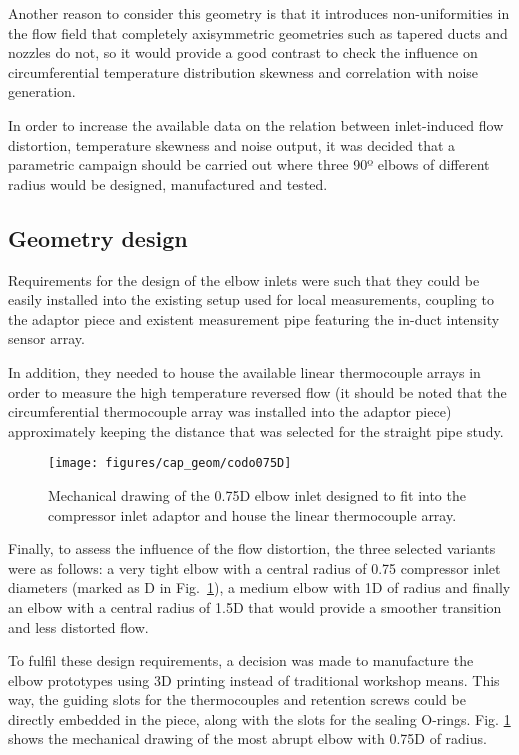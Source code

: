 Another reason to consider this geometry is that it introduces non-unifor\-mi\-ties in the flow field that completely axisymmetric geometries such as tapered ducts and nozzles do not, so it would provide a good contrast to check the influence on circumferential temperature distribution skewness and correlation with noise generation.

In order to increase the available data on the relation between inlet-induced flow distortion, temperature skewness and noise output, it was decided that a parametric campaign should be carried out where three 90º elbows of different radius would be designed, manufactured and tested.

\subsection{Geometry design}

Requirements for the design of the elbow inlets were such that they could be easily installed into the existing setup used for local measurements, coupling to the adaptor piece and existent measurement pipe featuring the in-duct intensity sensor array.

In addition, they needed to house the available linear thermocouple arrays in order to measure the high temperature reversed flow (it should be noted that the circumferential thermocouple array was installed into the adaptor piece) approximately keeping the distance that was selected for the straight pipe study.

\begin{figure}[htb!]
\centering
\texttt{[image: figures/cap\_geom/codo075D]}
\caption[Mechanical drawing of the 0.75D elbow inlet]{Mechanical drawing of the 0.75D elbow inlet designed to fit into the compressor inlet adaptor and house the linear thermocouple array.}
\label{fig:codo075D}
\end{figure}

Finally, to assess the influence of the flow distortion, the three selected variants were as follows: a very tight elbow with a central radius of 0.75 compressor inlet diameters (marked as D in Fig.~\ref{fig:codo075D}), a medium elbow with 1D of radius and finally an elbow with a central radius of 1.5D that would provide a smoother transition and less distorted flow.

To fulfil these design requirements, a decision was made to manufacture the elbow prototypes using 3D printing instead of traditional workshop means. This way, the guiding slots for the thermocouples and retention screws could be directly embedded in the piece, along with the slots for the sealing O-rings. Fig. \ref{fig:codo075D} shows the mechanical drawing of the most abrupt elbow with 0.75D of radius.

